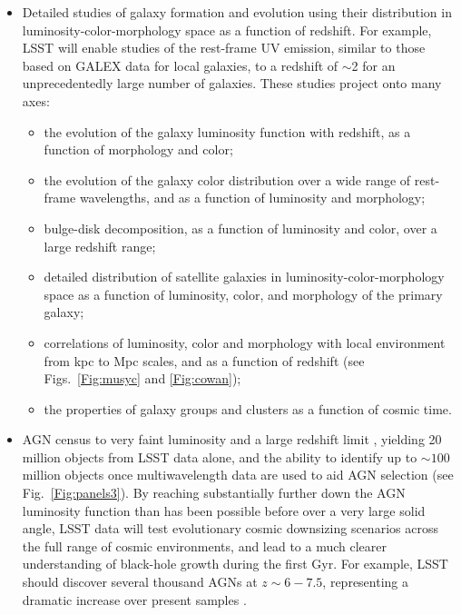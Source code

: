 \begin{itemize}
\item Detailed studies of galaxy formation and evolution using their distribution in
luminosity-color-morphology space as a function of redshift. For example, LSST will
enable studies of the rest-frame UV emission, similar to those based on GALEX data
for local galaxies, to a redshift of $\sim$2 for an unprecedentedly large number of
galaxies. These studies project onto many axes:
\begin{itemize}
  \item the evolution of the galaxy luminosity function with redshift, as a function of
        morphology and color;
  \item the evolution of the galaxy color distribution over a wide range of rest-frame
        wavelengths, and as a function of luminosity and morphology;
  \item bulge-disk decomposition, as a function of luminosity and color, over
        a large redshift range;
  \item detailed distribution of satellite galaxies in luminosity-color-morphology space
        as a function of luminosity, color, and morphology of the primary galaxy;
  \item correlations of luminosity, color and morphology with local environment from
           kpc to Mpc scales, and as a function of redshift (see  Figs.~\ref{Fig:musyc} and \ref{Fig:cowan});
  \item the properties of galaxy groups and clusters as a function of cosmic time.
\end{itemize}
\item AGN census to very faint luminosity and a large redshift limit
  \citep{2014IAUS..304...11I}, yielding 20 million objects from LSST
  data alone, and the ability to identify up to $\sim 100$ million objects once multiwavelength
      data are used to aid AGN selection (see Fig.~\ref{Fig:panels3}). By reaching substantially further
      down the AGN luminosity function than has been possible before over a very large solid angle, LSST data
      will test evolutionary cosmic downsizing scenarios across the full range of cosmic environments,
      and lead to a much clearer understanding of black-hole growth during the first Gyr. For
      example, LSST should discover several thousand AGNs at $z\sim6-7.5$,
      representing a dramatic increase over present samples
      \citep[][see also SciBook Ch.~10]{2007AAS...21113709B}.

\end{itemize}
